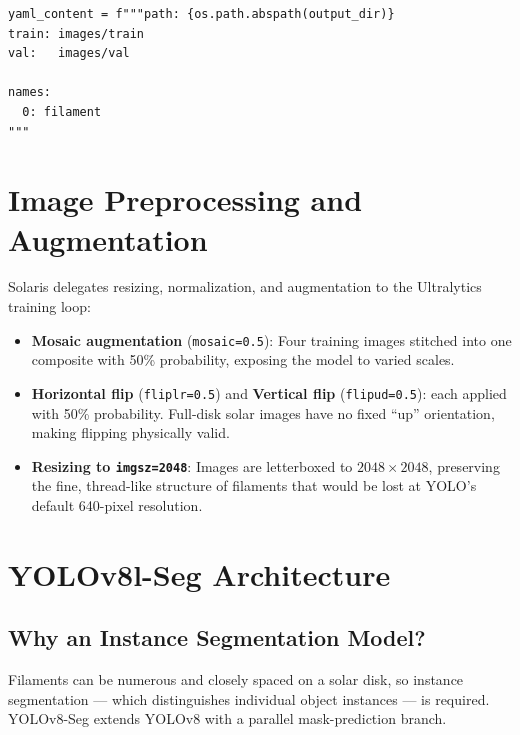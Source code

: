 \documentclass[11pt,a4paper,openany]{report}
\begin{document}
\begin{lstlisting}[caption={YOLO dataset descriptor (\texttt{data.yaml})},label={lst:yaml}]
yaml_content = f"""path: {os.path.abspath(output_dir)}
train: images/train
val:   images/val

names:
  0: filament
"""
\end{lstlisting}

\chapter{Image Preprocessing and Augmentation}

Solaris delegates resizing, normalization, and augmentation to the Ultralytics training loop:

\begin{itemize}
  \item \textbf{Mosaic augmentation} (\texttt{mosaic=0.5}): Four training images stitched into one
        composite with 50\% probability, exposing the model to varied scales.
  \item \textbf{Horizontal flip} (\texttt{fliplr=0.5}) and \textbf{Vertical flip} (\texttt{flipud=0.5}): each applied with 50\%
        probability. Full-disk solar images have no fixed ``up'' orientation, making flipping
        physically valid.
  \item \textbf{Resizing to \texttt{imgsz=2048}}: Images are letterboxed to $2048\times2048$,
        preserving the fine, thread-like structure of filaments that would be lost at YOLO's
        default 640-pixel resolution.
\end{itemize}

\chapter{YOLOv8l-Seg Architecture}

\section{Why an Instance Segmentation Model?}

Filaments can be numerous and closely spaced on a solar disk, so instance segmentation ---
which distinguishes individual object instances --- is required. YOLOv8-Seg extends YOLOv8
with a parallel mask-prediction branch.
\end{document}
